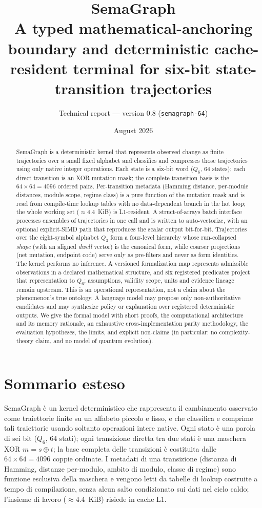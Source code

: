 \documentclass[11pt,a4paper]{article}
\title{SemaGraph\\[2pt]
\large A typed mathematical-anchoring boundary and deterministic cache-resident
terminal for six-bit state-transition trajectories}
\author{Technical report --- version 0.8 (\texttt{semagraph-64})}
\date{August 2026}
\begin{document}
\maketitle

\begin{abstract}
SemaGraph is a deterministic kernel that represents observed change as finite
trajectories over a small fixed alphabet and classifies and compresses those
trajectories using only native integer operations. Each state is a six-bit word
($Q_6$, $64$ states); each direct transition is an XOR mutation mask; the complete
transition basis is the $64\times64=4096$ ordered pairs. Per-transition metadata
(Hamming distance, per-module distances, module scope, regime class) is a pure
function of the mutation mask and is read from compile-time lookup tables with no
data-dependent branch in the hot loop; the whole working set ($\approx 4.4$~KiB)
is L1-resident. A struct-of-arrays batch interface processes ensembles of
trajectories in one call and is written to auto-vectorize, with an optional
explicit-SIMD path that reproduces the scalar output bit-for-bit. Trajectories
over the eight-symbol alphabet $Q_3$ form a four-level hierarchy whose
run-collapsed \emph{shape} (with an aligned \emph{dwell} vector) is the canonical
form, while coarser projections (net mutation, endpoint code) serve only as
pre-filters and never as form identities. The kernel performs no inference. A
versioned formalization map represents admissible observations in a declared
mathematical structure, and six registered predicates project that representation
to $Q_6$; assumptions, validity scope, units and evidence lineage remain upstream.
This is an operational representation, not a claim about the phenomenon's true
ontology. A language model may propose only non-authoritative candidates and may
synthesize policy or explanation over registered deterministic outputs. We give
the formal model with short proofs, the
computational architecture and its memory rationale, an exhaustive
cross-implementation parity methodology, the evaluation hypotheses, the limits,
and explicit non-claims (in particular: no complexity-theory claim, and no model
of quantum evolution).
\end{abstract}

\section*{Sommario esteso}
SemaGraph è un kernel deterministico che rappresenta il cambiamento osservato come
traiettorie finite su un alfabeto piccolo e fisso, e che classifica e comprime
tali traiettorie usando soltanto operazioni intere native. Ogni stato è una parola
di sei bit ($Q_6$, $64$ stati); ogni transizione diretta tra due stati è una
maschera XOR $m = s \oplus t$; la base completa delle transizioni è costituita
dalle $64 \times 64 = 4096$ coppie ordinate. I metadati di una transizione
(distanza di Hamming, distanze per-modulo, ambito di modulo, classe di regime)
sono funzione esclusiva della maschera e vengono letti da tabelle di lookup
costruite a tempo di compilazione, senza alcun salto condizionato sui dati nel
ciclo caldo; l'insieme di lavoro ($\approx 4.4$~KiB) risiede in cache L1.
\end{document}
